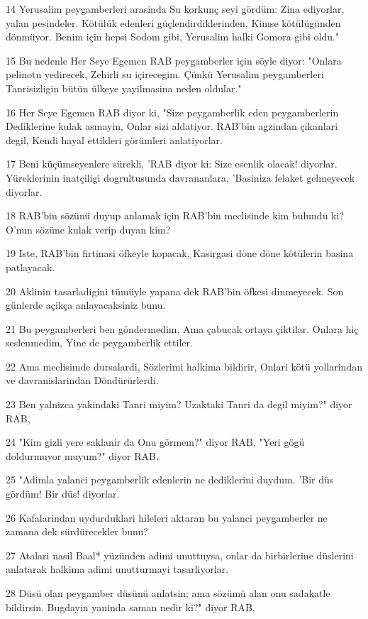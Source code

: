 \par 14 Yerusalim peygamberleri arasinda Su korkunç seyi gördüm: Zina ediyorlar, yalan pesindeler. Kötülük edenleri güçlendirdiklerinden, Kimse kötülügünden dönmüyor. Benim için hepsi Sodom gibi, Yerusalim halki Gomora gibi oldu."
\par 15 Bu nedenle Her Seye Egemen RAB peygamberler için söyle diyor: "Onlara pelinotu yedirecek, Zehirli su içirecegim. Çünkü Yerusalim peygamberleri Tanrisizligin bütün ülkeye yayilmasina neden oldular."
\par 16 Her Seye Egemen RAB diyor ki, "Size peygamberlik eden peygamberlerin Dediklerine kulak asmayin, Onlar sizi aldatiyor. RAB'bin agzindan çikanlari degil, Kendi hayal ettikleri görümleri anlatiyorlar.
\par 17 Beni küçümseyenlere sürekli, 'RAB diyor ki: Size esenlik olacak! diyorlar. Yüreklerinin inatçiligi dogrultusunda davrananlara, 'Basiniza felaket gelmeyecek diyorlar.
\par 18 RAB'bin sözünü duyup anlamak için RAB'bin meclisinde kim bulundu ki? O'nun sözüne kulak verip duyan kim?
\par 19 Iste, RAB'bin firtinasi öfkeyle kopacak, Kasirgasi döne döne kötülerin basina patlayacak.
\par 20 Aklinin tasarladigini tümüyle yapana dek RAB'bin öfkesi dinmeyecek. Son günlerde açikça anlayacaksiniz bunu.
\par 21 Bu peygamberleri ben göndermedim, Ama çabucak ortaya çiktilar. Onlara hiç seslenmedim, Yine de peygamberlik ettiler.
\par 22 Ama meclisimde dursalardi, Sözlerimi halkima bildirir, Onlari kötü yollarindan ve davranislarindan Döndürürlerdi.
\par 23 Ben yalnizca yakindaki Tanri miyim? Uzaktaki Tanri da degil miyim?" diyor RAB,
\par 24 "Kim gizli yere saklanir da Onu görmem?" diyor RAB, "Yeri gögü doldurmuyor muyum?" diyor RAB.
\par 25 "Adimla yalanci peygamberlik edenlerin ne dediklerini duydum. 'Bir düs gördüm! Bir düs! diyorlar.
\par 26 Kafalarindan uydurduklari hileleri aktaran bu yalanci peygamberler ne zamana dek sürdürecekler bunu?
\par 27 Atalari nasil Baal* yüzünden adimi unuttuysa, onlar da birbirlerine düslerini anlatarak halkima adimi unutturmayi tasarliyorlar.
\par 28 Düsü olan peygamber düsünü anlatsin; ama sözümü alan onu sadakatle bildirsin. Bugdayin yaninda saman nedir ki?" diyor RAB.

